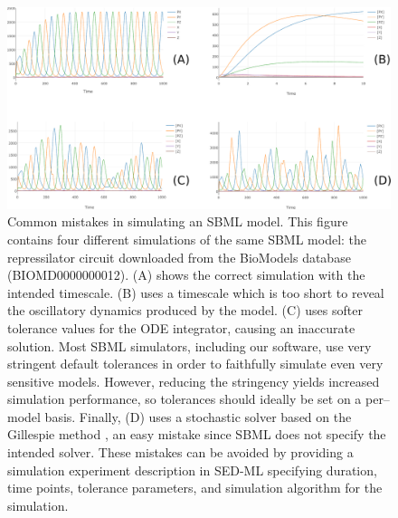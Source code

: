 \documentclass[10pt,letterpaper]{article}
\begin{document}
\begin{figure}
  \includegraphics[width=\textwidth]{elowitz-simulations.pdf}
  \caption{ Common mistakes in simulating an SBML model. This figure contains four different simulations of the same SBML model: the repressilator circuit \cite{elowitz2000synthetic} downloaded from the BioModels database (BIOMD0000000012). (A) shows the correct simulation with the intended timescale. (B) uses a timescale which is too short to reveal the oscillatory dynamics produced by the model. (C) uses softer tolerance values for the ODE integrator, causing an inaccurate solution. Most SBML simulators, including our software, use very stringent default tolerances in order to faithfully simulate even very sensitive models. However, reducing the stringency yields increased simulation performance, so tolerances should ideally be set on a per--model basis. Finally, (D) uses a stochastic solver based on the Gillespie method \cite{gillespie1977exact}, an easy mistake since SBML does not specify the intended solver. These mistakes can be avoided by providing a simulation experiment description in SED-ML specifying duration, time points, tolerance parameters, and simulation algorithm for the simulation. }
  \label{fig:mistakes}
\end{figure}
\end{document}
